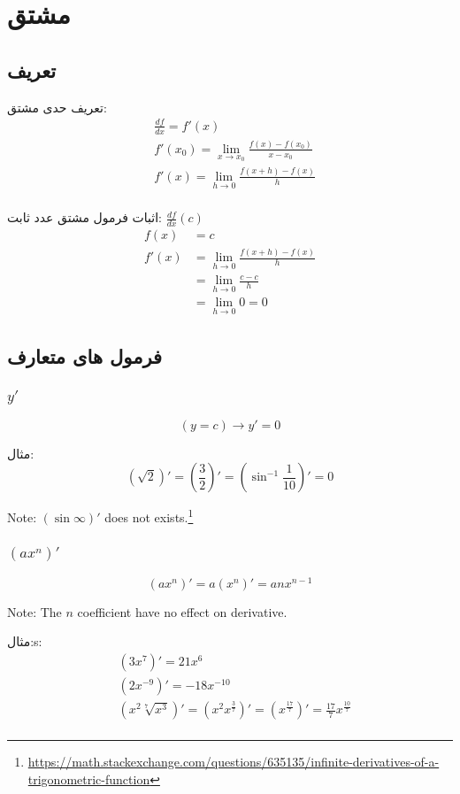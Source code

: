 \section{مشتق}
\subsection{تعریف}
تعریف حدی مشتق:
\begin{align*}
&\frac{df}{dx} = f'(x) \\
&f'(x_0) = \lim_{x\to x_0} \frac{f(x) - f(x_0)}{x-x_0} \\
&f'(x) = \lim_{h\to 0} \frac{f(x+h) - f(x)}{h} \\
\end{align*}

اثبات فرمول مشتق عدد ثابت: $\frac{df}{dx}(c)$
\begin{align*}
f(x) &= c \\
f'(x) &= \lim_{h\to 0}\frac{f(x+h) - f(x)}{h} \\
&= \lim_{h\to 0}\frac{c - c}{h} \\
&= \lim_{h\to 0} 0 = 0
\end{align*}

\subsection{فرمول های متعارف}
\subsubsection{$y'$}
\[ (y = c)\to y'= 0 \]

مثال:
\[ (\sqrt{2})' = (\frac{3}{2})' = (\sin^{-1}\frac{1}{10})' = 0 \]

Note: $(\sin\infty)'$ does not exists.\footnote{\href{https://math.stackexchange.com/questions/635135/infinite-derivatives-of-a-trigonometric-function}{https://math.stackexchange.com/questions/635135/infinite-derivatives-of-a-trigonometric-function}}

\subsubsection{$(ax^n)'$}
\[ (ax^n)' = a(x^n)' = anx^{n-1} \]

Note: The $n$ coefficient have no effect on derivative.

مثال:s:
\begin{align*}
&(3x^7)' = 21x^6 \\
&(2x^{-9})' = -18x^{-10} \\
&(x^{2}\sqrt[7]{x^3})'=
	(x^2 x^{\frac{3}{7}})' =
	(x^{\frac{17}{7}})' =
	\frac{17}{7} x^{\frac{10}{7}} \\
\end{align*}

